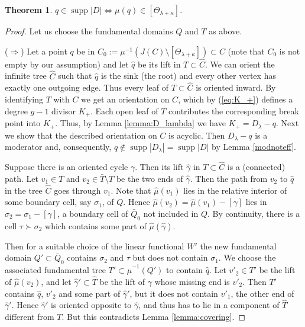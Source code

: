 \documentclass[12pt]{amsart}
\theoremstyle{plain}
\newtheorem{theorem}{Theorem}[section]
\theoremstyle{definition}
\theoremstyle{remark}
\newtheorem*{remark}{Remark}
\newcommand{\<}{\langle}   %
\renewcommand{\>}{\rangle} %
\newcommand{\supp}{\operatorname{supp}}
\begin{document}

\begin{theorem}\label{supp|D|}
$q\in\supp|D|  \Longleftrightarrow \mu(q) \in [\Theta_{\lambda+\kappa}]$.
\end{theorem}

\begin{proof}
Let us choose the fundamental domains $Q$ and $T$ as above.

($\Longrightarrow$)
Let a point $q$ be in $C_0:=\mu^{-1}(J(C)\setminus [\Theta_{\lambda+\kappa}])\subset C$
(note that $C_0$ is not empty by our assumption)
and let $\hat q$ be its lift in $T\subset \hat C$. We can orient the infinite tree $\hat C$ such that $\hat q$ is the sink (the root) and every other vertex has exactly one outgoing edge. Thus every leaf of $T\subset \hat C$ is oriented inward. By identifying $T$ with $C$ we get an orientation on $C$, which by (\ref{eq:K_+}) defines a degree $g-1$ divisor  $K_+$. Each open leaf of $T$ contributes the corresponding break point into $K_+$. Thus, by Lemma \ref{lemma:D_lambda} we have $K_+=D_\lambda-q$.
Next we show that the described orientation on $C$ is acyclic. Then $D_\lambda-q$ is a moderator and, consequently, $q\not\in\supp|D_\lambda|=\supp|D|$ by Lemma \ref{modnoteff}.

Suppose there is an oriented cycle $\gamma$. Then its lift $\hat \gamma$ in $T\subset \hat C$ is a (connected) path. Let $v_1\in T$ and $v_2\in \bar T \setminus T$ be the two ends of $\hat \gamma$.
Then the path from $v_2$ to $\hat q$ in the tree $\hat C$ goes through $v_1$.
Note that $\hat \mu (v_1)$ lies in the relative interior of some boundary cell, say $\sigma_1$, of $Q$. Hence $\hat \mu (v_2)=\hat \mu(v_1)-[\gamma]$ lies in $\sigma_2=\sigma_1-[\gamma]$, a boundary cell of $\bar Q_0$ not included in $Q$. By continuity, there is a cell $\tau\succ\sigma_2$ which contains some part of $\hat\mu (\hat \gamma)$.

Then for a suitable choice of the linear functional $W'$ the new fundamental domain $Q'\subset \bar Q_0$ contains $\sigma_2$ and $\tau$ but does not contain $\sigma_1$. We choose the associated fundamental tree $T'\subset \hat \mu ^{-1} (Q')$ to contain $\hat q$. Let $v'_2\in T'$ be the lift of $\hat \mu (v_2)$, and let $\hat \gamma'\subset \hat T$ be the lift of $\gamma$ whose missing end is $v'_2$. Then $T'$ contains $\hat q$, $v'_2$ and some part of $\hat \gamma'$, but it does not contain $v'_1$, the other end of $\hat \gamma'$. Hence $\hat\gamma'$ is oriented opposite to $\hat \gamma$, and thus has to lie in a component of $\hat T$ different from $T$. But this contradicts Lemma \ref{lemma:covering}.



\end{proof}
\end{document}
